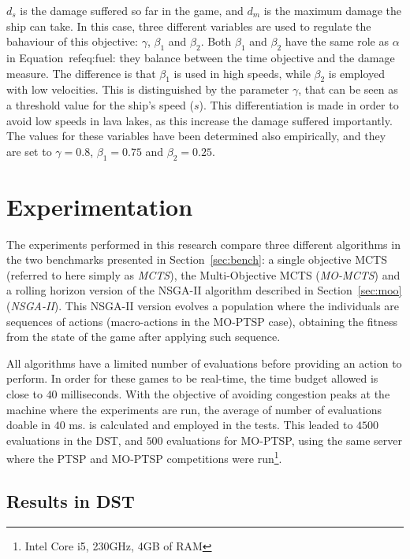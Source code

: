 \documentclass[journal]{IEEEtran}
\begin{document}
$d_s$ is the damage suffered so far in the game, and $d_m$ is the maximum damage the ship can take. In this case, three different variables are used to regulate the bahaviour of this objective: $\gamma$, $\beta_{1}$ and $\beta_{2}$. Both $\beta_{1}$ and $\beta_{2}$ have the same role as $\alpha$ in Equation~ref{eq:fuel}: they balance between the time objective and the damage measure. The difference is that $\beta_{1}$ is used in high speeds, while $\beta_{2}$ is employed with low velocities. This is distinguished by the parameter $\gamma$, that can be seen as a threshold value for the ship's speed ($s$). This differentiation is made in order to avoid low speeds in lava lakes, as this increase the damage suffered importantly. The values for these variables have been determined also empirically, and they are set to $\gamma = 0.8$, $\beta_{1} = 0.75$ and $\beta_{2} = 0.25$.

\section{Experimentation} \label{sec:exp}

The experiments performed in this research compare three different algorithms in the two benchmarks presented in Section~\ref{sec:bench}: a single objective MCTS (referred to here simply as \textit{MCTS}), the Multi-Objective MCTS (\textit{MO-MCTS}) and a rolling horizon version of the NSGA-II algorithm described in Section~\ref{sec:moo} (\textit{NSGA-II}). This NSGA-II version evolves a population where the individuals are sequences of actions (macro-actions in the MO-PTSP case), obtaining the fitness from the state of the game after applying such sequence. 

All algorithms have a limited number of evaluations before providing an action to perform. In order for these games to be real-time, the time budget allowed is close to $40$ milliseconds. With the objective of avoiding congestion peaks at the machine where the experiments are run, the average of number of evaluations doable in $40$ ms. is calculated and employed in the tests. This leaded to $4500$ evaluations in the DST, and $500$ evaluations for MO-PTSP, using the same server where the PTSP and MO-PTSP competitions were run\footnote{Intel Core i5, 230GHz, 4GB of RAM}.




\subsection{Results in DST} \label{ssec:resDST}
\end{document}
